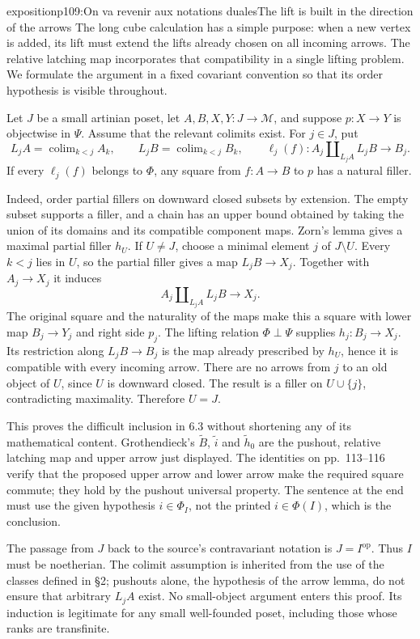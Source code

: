 \begin{dcomment}{exposition}{p109:On va revenir aux notations duales}{The lift is built in the direction of the arrows}
The long cube calculation has a simple purpose: when a new vertex is added, its lift must extend the lifts already chosen on all incoming arrows. The relative latching map incorporates that compatibility in a single lifting problem. We formulate the argument in a fixed covariant convention so that its order hypothesis is visible throughout.

Let $J$ be a small artinian poset, let $A,B,X,Y:J\to\mathcal M$, and suppose $p:X\to Y$ is objectwise in $\Psi$. Assume that the relevant colimits exist. For $j\in J$, put
\[
 L_jA=\operatorname{colim}_{k<j}A_k,\qquad
 L_jB=\operatorname{colim}_{k<j}B_k,\qquad
 \ell_j(f):A_j\amalg_{L_jA}L_jB\longrightarrow B_j.
\]
If every $\ell_j(f)$ belongs to $\Phi$, any square from $f:A\to B$ to $p$ has a natural filler.

Indeed, order partial fillers on downward closed subsets by extension. The empty subset supports a filler, and a chain has an upper bound obtained by taking the union of its domains and its compatible component maps. Zorn's lemma gives a maximal partial filler $h_U$. If $U\ne J$, choose a minimal element $j$ of $J\setminus U$. Every $k<j$ lies in $U$, so the partial filler gives a map $L_jB\to X_j$. Together with $A_j\to X_j$ it induces
\[
 A_j\amalg_{L_jA}L_jB\longrightarrow X_j.
\]
The original square and the naturality of the maps make this a square with lower map $B_j\to Y_j$ and right side $p_j$. The lifting relation $\Phi\perp\Psi$ supplies $h_j:B_j\to X_j$. Its restriction along $L_jB\to B_j$ is the map already prescribed by $h_U$, hence it is compatible with every incoming arrow. There are no arrows from $j$ to an old object of $U$, since $U$ is downward closed. The result is a filler on $U\cup\{j\}$, contradicting maximality. Therefore $U=J$.

This proves the difficult inclusion in 6.3 without shortening any of its mathematical content. Grothendieck's $\widetilde B$, $\widetilde i$ and $\widetilde h_0$ are the pushout, relative latching map and upper arrow just displayed. The identities on pp.~113--116 verify that the proposed upper arrow and lower arrow make the required square commute; they hold by the pushout universal property. The sentence at the end must use the given hypothesis $i\in\Phi_I$, not the printed $i\in\Phi(I)$, which is the conclusion.

The passage from $J$ back to the source's contravariant notation is $J=I^{\mathrm{op}}$. Thus $I$ must be noetherian. The colimit assumption is inherited from the use of the classes defined in \S2; pushouts alone, the hypothesis of the arrow lemma, do not ensure that arbitrary $L_jA$ exist. No small-object argument enters this proof. Its induction is legitimate for any small well-founded poset, including those whose ranks are transfinite.
\end{dcomment}

